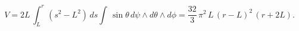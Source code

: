 \begin{equation}
V=2L\,\int_{L}^{r}(s^2-L^2)\,ds \int\,\sin\theta\, d\psi \wedge
d\theta \wedge d\phi= \frac{32}{3}\,\pi^2\,L\,(r-L)^2\,(r+2L).
\end{equation}

